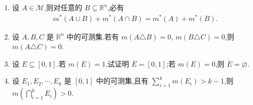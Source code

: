 \documentclass[../../main.tex]{subfiles}%
\begin{document}
\begin{proposition}
\begin{enumerate}[(1)]
\item 设 $A\in\mathscr{M}$,则对任意的 $B\subseteq\mathbb{R}^n$,必有
\begin{align*}
m^*(A\cup B)+m^*(A\cap B)=m^*(A)+m^*(B).
\end{align*}
\item 设 $A,B,C$ 是 $\mathbb{R}^n$ 中的可测集.若有 $m(A\triangle B)=0$, $m(B\triangle C)=0$,则 $m(A\triangle C)=0$.
\item 设 $E\subseteq[0,1]$.若 $m(E)=1$,试证明 $\overline{E}=[0,1]$;若 $m(E)=0$,则 $\mathring{E}=\varnothing$.
\item 设 $E_1,E_2,\cdots,E_k$ 是 $[0,1]$ 中的可测集,且有 $\sum\limits_{i=1}^{k}m(E_i)>k-1$,则 $m\left(\bigcap\limits_{i=1}^{k}E_i\right)>0$.
\end{enumerate}
\end{proposition}
\end{document}
